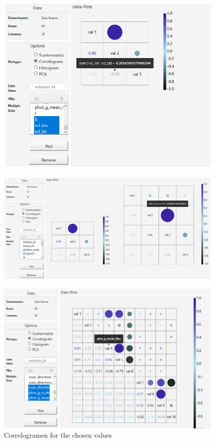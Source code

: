 \documentclass{article}
\begin{document}
\begin{figure}[!h]
\centering
\includegraphics[width=1\textwidth]{images/m3/corr1.PNG}
\label{fig4}
\end{figure}
\begin{figure}[!h]
\centering
\includegraphics[width=1\textwidth]{images/m3/corr2.PNG}
\end{figure}
\begin{figure}[!h]
\centering
\includegraphics[width=1\textwidth]{images/m3/corr3.PNG}
\caption{Correlogramen for the chosen values}
\end{figure}
\newpage
\end{document}
